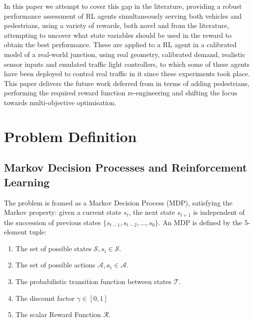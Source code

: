 \documentclass[a4paper, conference]{IEEEtran}
\begin{document}
In this paper we attempt to cover this gap in the literature, providing a robust performance assessment of RL agents simultaneously serving both vehicles and pedestrians, using a variety of rewards, both novel and from the literature, attempting to uncover what state variables should be used in the reward to obtain the best performance.
These are applied to a RL agent in a calibrated model of a real-world junction, using real geometry, calibrated demand, realistic sensor inputs and emulated traffic light controllers, to which some of these agents have been deployed to control real traffic in it since these experiments took place.
This paper delivers the future work deferred from \cite{previous} in terms of adding pedestrians, performing the required reward function re-engineering and shifting the focus towards multi-objective optimisation.
\section{Problem Definition}
\label{problem}
\subsection{Markov Decision Processes and Reinforcement Learning}
The problem is framed as a Markov Decision Process (MDP), satisfying the Markov property: given a current state $s_t$, the next state $s_{t+1}$ is independent of the succession of previous states $\{s_{t-1}, s_{t-2}, ..., s_0\}$.
An MDP is defined by the 5-element tuple:
\begin{enumerate}
\item The set of possible states $\mathcal{S}, s_i\in \mathcal{S}$.
\item The set of possible actions $\mathcal{A}, a_i\in \mathcal{A}$.
\item The probabilistic transition function between states $\mathcal{T}$.
\item The discount factor $\gamma \in [0,1]$ 
\item The scalar Reward Function $\mathcal{R}$. 
\end{enumerate}
\end{document}
